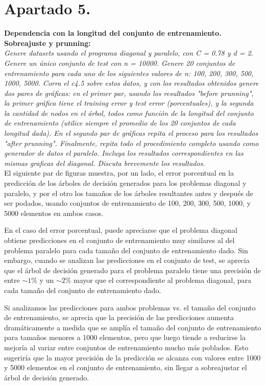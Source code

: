 \documentclass[a4paper, 11pt]{article} %
\begin{document}
\section*{Apartado 5.} 
\textbf{Dependencia con la longitud del conjunto de entrenamiento. Sobreajuste
y prunning:}\\ 
\textit{Genere datasets usando el programa diagonal y paralelo, con C = 0.78 y
d = 2. Genere un único conjunto de test con n = 10000.  Genere 20 conjuntos de
entrenamiento para cada uno de los siguientes valores de n: 100, 200, 300, 500,
1000, 5000.  Corra el c4.5 sobre estos datos, y con los resultados obtenidos
genere dos pares de gráficas: en el primer par, usando los resultados "before
prunning", la primer gráfica tiene el training error y test error
(porcentuales), y la segunda la cantidad de nodos en el árbol, todos como
función de la longitud del conjunto de entrenamiento (utilice siempre el
promedio de los 20 conjuntos de cada longitud dada). En el segundo par de
gráficas repita el proceso para los resultados "after prunning".  Finalmente,
repita todo el procedimiento completo usando como generador de datos el
paralelo. Incluya los resultados correspondientes en las mismas graficas del
diagonal. Discuta brevemente los resultados.}\\

El siguiente par de figuras muestra, por un lado, el error porcentual en la
predicción de los árboles de decisión generados para los problemas diagonal y
paralelo, y por el otro los tamaños de los árboles resultantes antes y después
de ser podados, usando conjuntos de entrenamiento de 100, 200, 300, 500, 1000,
y 5000 elementos en ambos casos.

En el caso del error porcentual, puede apreciarse que el problema diagonal
obtiene predicciones en el conjunto de entrenamiento muy similares al del
problema paralelo para cada tamaño del conjunto de entrenamiento dado. Sin
embargo, cuando se analizan las predicciones en el conjunto de test, se aprecia
que el árbol de decisión generado para el problema paralelo tiene una precisión
de entre $\sim1\%$ y un $\sim2\%$ mayor que el correspondiente al problema
diagonal, para cada tamaño del conjunto de entrenamiento dado.

Si analizamos las predicciones para ambos problemas vs. el tamaño del conjunto
de entrenamiento, se aprecia que la precisión de las predicciones aumenta
dramáticamente a medida que se amplía el tamaño del conjunto de entrenamiento
para tamaños menores a 1000 elementos, pero que luego tiende a reducirse la
mejoría al variar entre conjuntos de entrenamiento mucho más poblados.  Esto
sugeriría que la mayor precisión de la predicción se alcanza con valores entre
1000 y 5000 elementos en el conjunto de entrenamiento, sin llegar a
sobreajustar el árbol de decisión generado.
\end{document}
